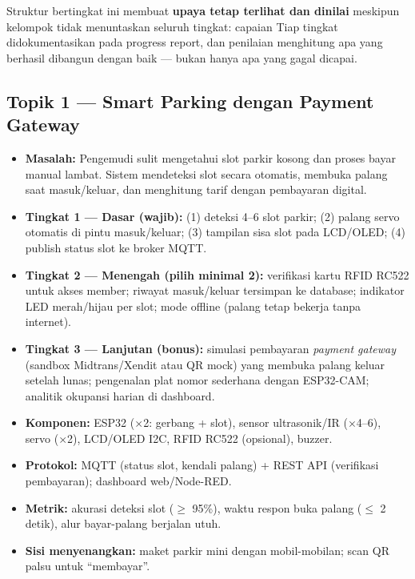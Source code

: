 \documentclass[11pt,a4paper]{article}
\begin{document}
Struktur bertingkat ini membuat \textbf{upaya tetap terlihat dan dinilai}
meskipun kelompok tidak menuntaskan seluruh tingkat: capaian Tiap tingkat
didokumentasikan pada progress report, dan penilaian menghitung apa yang
berhasil dibangun dengan baik --- bukan hanya apa yang gagal dicapai.

\subsection*{Topik 1 --- Smart Parking dengan Payment Gateway}

\begin{itemize}
  \item \textbf{Masalah:} Pengemudi sulit mengetahui slot parkir kosong dan
        proses bayar manual lambat. Sistem mendeteksi slot secara otomatis,
        membuka palang saat masuk/keluar, dan menghitung tarif dengan
        pembayaran digital.
  \item \textbf{Tingkat 1 --- Dasar (wajib):} (1) deteksi 4--6 slot parkir;
        (2) palang servo otomatis di pintu masuk/keluar; (3) tampilan sisa
        slot pada LCD/OLED; (4) publish status slot ke broker MQTT.
  \item \textbf{Tingkat 2 --- Menengah (pilih minimal 2):} verifikasi
        kartu RFID RC522 untuk akses member; riwayat masuk/keluar tersimpan ke
        database; indikator LED merah/hijau per slot; mode offline (palang
        tetap bekerja tanpa internet).
  \item \textbf{Tingkat 3 --- Lanjutan (bonus):} simulasi pembayaran
        \emph{payment gateway} (sandbox Midtrans/Xendit atau QR mock) yang
        membuka palang keluar setelah lunas; pengenalan plat nomor sederhana
        dengan ESP32-CAM; analitik okupansi harian di dashboard.
  \item \textbf{Komponen:} ESP32 ($\times$2: gerbang + slot), sensor
        ultrasonik/IR ($\times$4--6), servo ($\times$2), LCD/OLED I2C,
        RFID RC522 (opsional), buzzer.
  \item \textbf{Protokol:} MQTT (status slot, kendali palang) + REST API
        (verifikasi pembayaran); dashboard web/Node-RED.
  \item \textbf{Metrik:} akurasi deteksi slot ($\geq$ 95\%), waktu respon
        buka palang ($\leq$ 2 detik), alur bayar-palang berjalan utuh.
  \item \textbf{Sisi menyenangkan:} maket parkir mini dengan mobil-mobilan;
        scan QR palsu untuk ``membayar''.
\end{itemize}
\end{document}
